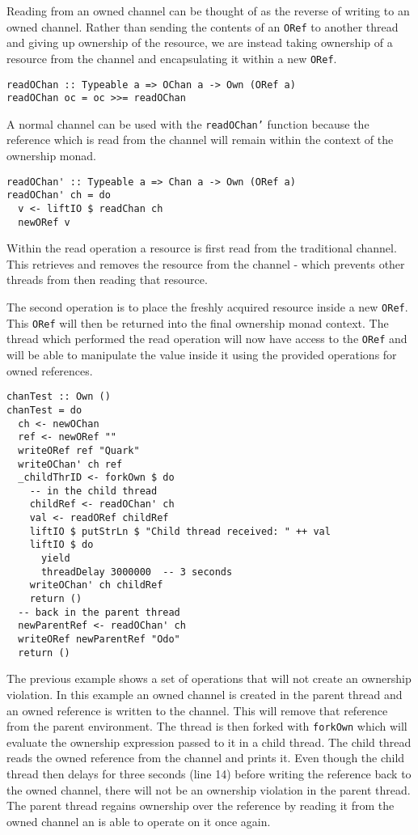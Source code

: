 \documentclass[onehalf,11pt]{beavtex}
\begin{document}
Reading from an owned channel can be thought of as the reverse of writing to an
owned channel.
Rather than sending the contents of an \texttt{ORef} to another thread and giving 
up ownership of the resource,
we are instead taking ownership of a resource from the channel and encapsulating
it within a new \texttt{ORef}.

\begin{verbatim}
readOChan :: Typeable a => OChan a -> Own (ORef a)
readOChan oc = oc >>= readOChan
\end{verbatim}

A normal channel can be used with the \texttt{readOChan'} function because
the reference which is read from the channel will remain within the context
of the ownership monad. 

\begin{verbatim}
readOChan' :: Typeable a => Chan a -> Own (ORef a)
readOChan' ch = do
  v <- liftIO $ readChan ch
  newORef v
\end{verbatim}

Within the read operation a resource is first read from the traditional
channel.
This retrieves and removes the resource from the channel - which prevents other
threads from then reading that resource.

The second operation is to place the freshly acquired resource inside a new
\texttt{ORef}.  This \texttt{ORef} will then be returned into the
final ownership monad context.
The thread which performed the read operation will now have access to the
\texttt{ORef} and will be able to manipulate the value inside it using the
provided operations for owned references. \\

\begin{lstlisting}
chanTest :: Own ()
chanTest = do
  ch <- newOChan
  ref <- newORef ""
  writeORef ref "Quark"
  writeOChan' ch ref
  _childThrID <- forkOwn $ do
    -- in the child thread
    childRef <- readOChan' ch
    val <- readORef childRef
    liftIO $ putStrLn $ "Child thread received: " ++ val
    liftIO $ do 
      yield
      threadDelay 3000000  -- 3 seconds
    writeOChan' ch childRef
    return ()
  -- back in the parent thread
  newParentRef <- readOChan' ch
  writeORef newParentRef "Odo"
  return ()
\end{lstlisting}

The previous example shows a set of operations that will not create an ownership
violation. In this example an owned channel is created in the parent thread and
an owned reference is written to the channel.
This will remove that reference from the parent environment.
The thread is then forked with \texttt{forkOwn} which will evaluate the
ownership expression passed to it in a child thread.
The child thread reads the owned reference from the channel and prints it.
Even though the child thread then delays for three seconds (line 14) before
writing the reference back to the owned channel, there will not be an ownership
violation in the parent thread.
The parent thread regains ownership over the reference by reading it from the
owned channel an is able to operate on it once again.
\end{document}
